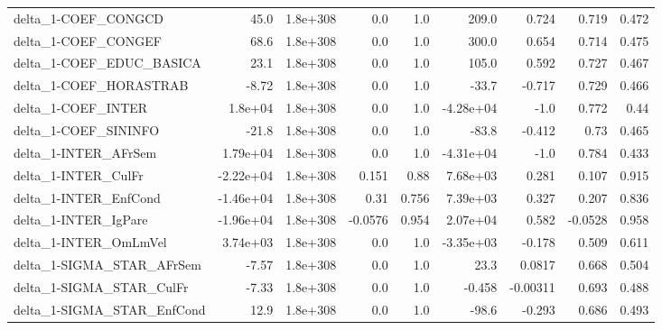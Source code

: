 \begin{tabular}{lrrrrrrrr}
delta\_1-COEF\_CONGCD                   &        45.0 &     1.8e+308 &     0.0 &      1.0 &      209.0 &       0.724 &        0.719 &         0.472 \\
delta\_1-COEF\_CONGEF                   &        68.6 &     1.8e+308 &     0.0 &      1.0 &      300.0 &       0.654 &        0.714 &         0.475 \\
delta\_1-COEF\_EDUC\_BASICA              &        23.1 &     1.8e+308 &     0.0 &      1.0 &      105.0 &       0.592 &        0.727 &         0.467 \\
delta\_1-COEF\_HORASTRAB                &       -8.72 &     1.8e+308 &     0.0 &      1.0 &      -33.7 &      -0.717 &        0.729 &         0.466 \\
delta\_1-COEF\_INTER                    &     1.8e+04 &     1.8e+308 &     0.0 &      1.0 &  -4.28e+04 &        -1.0 &        0.772 &          0.44 \\
delta\_1-COEF\_SININFO                  &       -21.8 &     1.8e+308 &     0.0 &      1.0 &      -83.8 &      -0.412 &         0.73 &         0.465 \\
delta\_1-INTER\_AFrSem                  &    1.79e+04 &     1.8e+308 &     0.0 &      1.0 &  -4.31e+04 &        -1.0 &        0.784 &         0.433 \\
delta\_1-INTER\_CulFr                   &   -2.22e+04 &     1.8e+308 &   0.151 &     0.88 &   7.68e+03 &       0.281 &        0.107 &         0.915 \\
delta\_1-INTER\_EnfCond                 &   -1.46e+04 &     1.8e+308 &    0.31 &    0.756 &   7.39e+03 &       0.327 &        0.207 &         0.836 \\
delta\_1-INTER\_IgPare                  &   -1.96e+04 &     1.8e+308 & -0.0576 &    0.954 &   2.07e+04 &       0.582 &      -0.0528 &         0.958 \\
delta\_1-INTER\_OmLmVel                 &    3.74e+03 &     1.8e+308 &     0.0 &      1.0 &  -3.35e+03 &      -0.178 &        0.509 &         0.611 \\
delta\_1-SIGMA\_STAR\_AFrSem             &       -7.57 &     1.8e+308 &     0.0 &      1.0 &       23.3 &      0.0817 &        0.668 &         0.504 \\
delta\_1-SIGMA\_STAR\_CulFr              &       -7.33 &     1.8e+308 &     0.0 &      1.0 &     -0.458 &    -0.00311 &        0.693 &         0.488 \\
delta\_1-SIGMA\_STAR\_EnfCond            &        12.9 &     1.8e+308 &     0.0 &      1.0 &      -98.6 &      -0.293 &        0.686 &         0.493 \\

\end{tabular}

